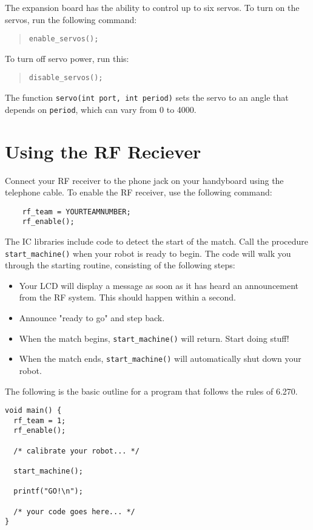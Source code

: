 The expansion board has the ability to control up to six servos.
To turn on the servos, run the following command:
\begin{quote}
\begin{verbatim}
enable_servos();
\end{verbatim}
\end{quote}
To turn off servo power, run this:
\begin{quote}
\begin{verbatim}
disable_servos();
\end{verbatim}
\end{quote}

The function \verb^servo(int port, int period)^ sets the servo to an
angle that depends on \texttt{period}, which can vary from 0 to 4000.

\section{Using the RF Reciever}
Connect your RF receiver to the phone jack on your handyboard using the telephone cable.  To enable the RF receiver, use the following command:

\begin{verbatim}
    rf_team = YOURTEAMNUMBER;
    rf_enable();
\end{verbatim}

The IC libraries include code to detect the start of the match.  Call the procedure \verb+start_machine()+ when your robot is ready to begin.  The code will walk you through the starting routine, consisting of the following
steps:

\begin{itemize}
\item Your LCD will display a message as soon as it has heard an announcement from the RF system.  This should happen within a second.

\item Announce "ready to go" and step back.

\item When the match begins, \verb+start_machine()+ will return.  Start doing stuff!

\item When the match ends, \verb+start_machine()+ will automatically shut down your robot.
\end{itemize}

The following is the basic outline for a program that follows the rules of 6.270.

\begin{verbatim}
void main() {
  rf_team = 1;
  rf_enable();

  /* calibrate your robot... */

  start_machine();

  printf("GO!\n");

  /* your code goes here... */
}
\end{verbatim}
